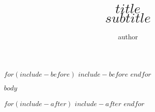 \documentclass[english,draft]{sdqthesis}%
\author{author}
\title{$title$\\
$subtitle$}
\begin{document}
$for(include-before)$
$include-before$
$endfor$

\setpdf

\maketitle

\frontmatter



\setcounter{page}{1}

 


\tableofcontents

\listoffigures
\listoftables


\mainmatter

$body$

\backmatter


\printbibliography[heading=bibintoc]


\appendix

$for(include-after)$
$include-after$
$endfor$
\end{document}
